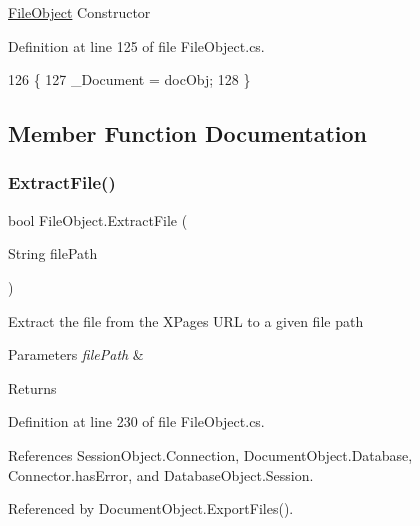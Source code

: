 \mbox{\hyperlink{class_file_object}{File\+Object}} Constructor 



Definition at line 125 of file File\+Object.\+cs.


\begin{DoxyCode}
126     \{
127         \_Document = docObj;
128     \}
\end{DoxyCode}


\subsection{Member Function Documentation}
\mbox{\label{class_file_object_ae21fac09c5ab2f9fac96a3f084cb9ddc}} 
\subsubsection{\texorpdfstring{Extract\+File()}{ExtractFile()}}
{\footnotesize\ttfamily bool File\+Object.\+Extract\+File (\begin{DoxyParamCaption}\item[{String}]{file\+Path }\end{DoxyParamCaption})}



Extract the file from the X\+Pages U\+RL to a given file path 


\begin{DoxyParams}{Parameters}
{\em file\+Path} & \\
\hline
\end{DoxyParams}
\begin{DoxyReturn}{Returns}

\end{DoxyReturn}


Definition at line 230 of file File\+Object.\+cs.



References Session\+Object.\+Connection, Document\+Object.\+Database, Connector.\+has\+Error, and Database\+Object.\+Session.



Referenced by Document\+Object.\+Export\+Files().


